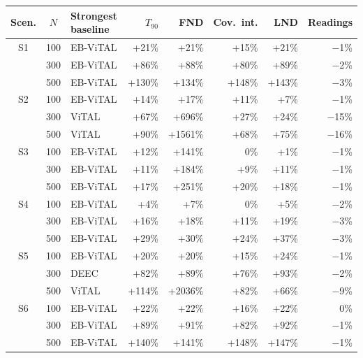 \begin{tabular}{cclrrrrr}
\toprule
Scen. & $N$ & Strongest baseline & $T_{90}$ & FND & Cov.\ int. & LND & Readings \\
\midrule
S1 & 100 & EB-ViTAL & +21\% & +21\% & +15\% & +21\% & $-$1\% \\
 & 300 & EB-ViTAL & +86\% & +88\% & +80\% & +89\% & $-$2\% \\
 & 500 & EB-ViTAL & +130\% & +134\% & +148\% & +143\% & $-$3\% \\
\midrule
S2 & 100 & EB-ViTAL & +14\% & +17\% & +11\% & +7\% & $-$1\% \\
 & 300 & ViTAL & +67\% & +696\% & +27\% & +24\% & $-$15\% \\
 & 500 & ViTAL & +90\% & +1561\% & +68\% & +75\% & $-$16\% \\
\midrule
S3 & 100 & EB-ViTAL & +12\% & +141\% & 0\% & +1\% & $-$1\% \\
 & 300 & EB-ViTAL & +11\% & +184\% & +9\% & +11\% & $-$1\% \\
 & 500 & EB-ViTAL & +17\% & +251\% & +20\% & +18\% & $-$1\% \\
\midrule
S4 & 100 & EB-ViTAL & +4\% & +7\% & 0\% & +5\% & $-$2\% \\
 & 300 & EB-ViTAL & +16\% & +18\% & +11\% & +19\% & $-$3\% \\
 & 500 & EB-ViTAL & +29\% & +30\% & +24\% & +37\% & $-$3\% \\
\midrule
S5 & 100 & EB-ViTAL & +20\% & +20\% & +15\% & +24\% & $-$1\% \\
 & 300 & DEEC & +82\% & +89\% & +76\% & +93\% & $-$2\% \\
 & 500 & ViTAL & +114\% & +2036\% & +82\% & +66\% & $-$9\% \\
\midrule
S6 & 100 & EB-ViTAL & +22\% & +22\% & +16\% & +22\% & 0\% \\
 & 300 & EB-ViTAL & +89\% & +91\% & +82\% & +92\% & $-$1\% \\
 & 500 & EB-ViTAL & +140\% & +141\% & +148\% & +147\% & $-$1\% \\
\bottomrule
\end{tabular}
